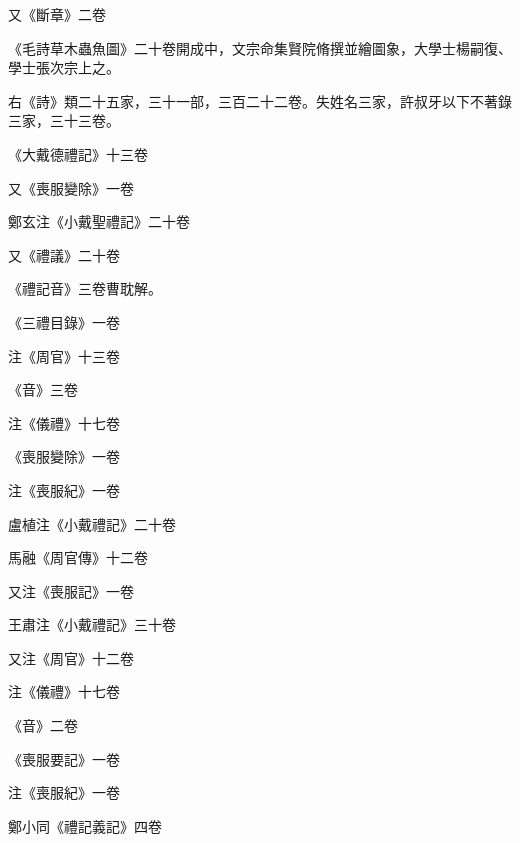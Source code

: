 \begin{pinyinscope}
 又《斷章》二卷



 《毛詩草木蟲魚圖》二十卷開成中，文宗命集賢院脩撰並繪圖象，大學士楊嗣復、學士張次宗上之。



 右《詩》類二十五家，三十一部，三百二十二卷。失姓名三家，許叔牙以下不著錄三家，三十三卷。



 《大戴德禮記》十三卷



 又《喪服變除》一卷



 鄭玄注《小戴聖禮記》二十卷



 又《禮議》二十卷



 《禮記音》三卷曹耽解。



 《三禮目錄》一卷



 注《周官》十三卷



 《音》三卷



 注《儀禮》十七卷



 《喪服變除》一卷



 注《喪服紀》一卷



 盧植注《小戴禮記》二十卷



 馬融《周官傳》十二卷



 又注《喪服記》一卷



 王肅注《小戴禮記》三十卷



 又注《周官》十二卷



 注《儀禮》十七卷



 《音》二卷



 《喪服要記》一卷



 注《喪服紀》一卷



 鄭小同《禮記義記》四卷




\end{pinyinscope}
